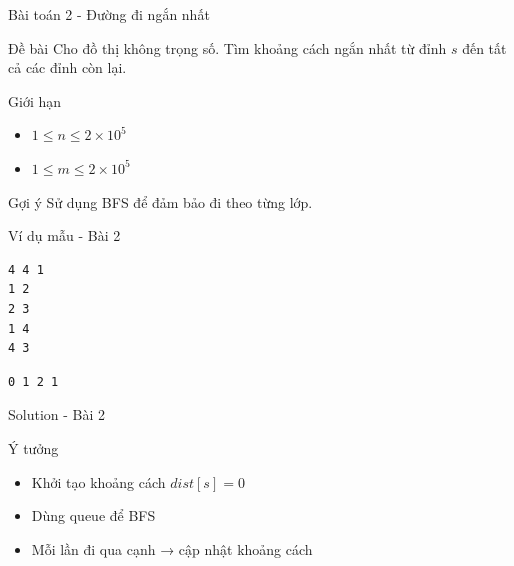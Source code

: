 \documentclass{beamer}
\begin{document}
\begin{frame}{Bài toán 2 - Đường đi ngắn nhất}

    \begin{block}{Đề bài}
        Cho đồ thị không trọng số.
        Tìm khoảng cách ngắn nhất từ đỉnh $s$ đến tất cả các đỉnh còn lại.
    \end{block}

    \pause

    \begin{block}{Giới hạn}
        \begin{itemize}
            \item $1 \le n \le 2 \times 10^5$
            \item $1 \le m \le 2 \times 10^5$
        \end{itemize}
    \end{block}

    \pause

    \begin{alertblock}{Gợi ý}
        Sử dụng BFS để đảm bảo đi theo từng lớp.
    \end{alertblock}

\end{frame}

\begin{frame}[fragile]{Ví dụ mẫu - Bài 2}

    \begin{tcolorbox}[title=Input]
        \begin{verbatim}
4 4 1
1 2
2 3
1 4
4 3
\end{verbatim}
    \end{tcolorbox}

    \pause

    \begin{tcolorbox}[title=Output]
        \begin{verbatim}
0 1 2 1
\end{verbatim}
    \end{tcolorbox}

\end{frame}

\begin{frame}[fragile]{Solution - Bài 2}

    \begin{block}{Ý tưởng}
        \begin{itemize}
            \item Khởi tạo khoảng cách $dist[s] = 0$
            \item Dùng queue để BFS
            \item Mỗi lần đi qua cạnh → cập nhật khoảng cách
        \end{itemize}
    \end{block}


\end{frame}
\end{document}
